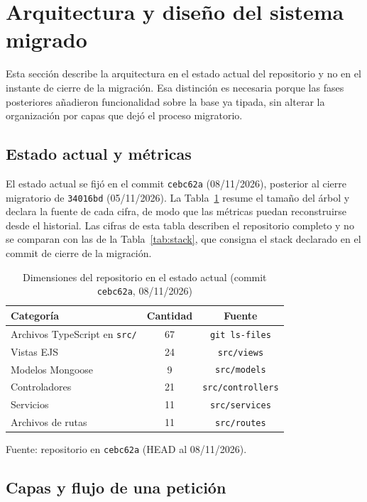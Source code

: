 \documentclass[conference]{IEEEtran}
\begin{document}
\section{Arquitectura y diseño del sistema migrado}

Esta sección describe la arquitectura en el estado actual del repositorio y no
en el instante de cierre de la migración. Esa distinción es necesaria porque las
fases posteriores añadieron funcionalidad sobre la base ya tipada, sin alterar
la organización por capas que dejó el proceso migratorio.

\subsection{Estado actual y métricas}

El estado actual se fijó en el commit \texttt{cebc62a} (08/11/2026), posterior
al cierre migratorio de \texttt{34016bd} (05/11/2026). La
Tabla~\ref{tab:actual} resume el tamaño del árbol y declara la fuente de cada
cifra, de modo que las métricas puedan reconstruirse desde el historial. Las
cifras de esta tabla describen el repositorio completo y no se comparan con las
de la Tabla~\ref{tab:stack}, que consigna el stack declarado en el commit de
cierre de la migración.

\begin{table}[!t]
\caption{Dimensiones del repositorio en el estado actual (commit \texttt{cebc62a}, 08/11/2026)}
\label{tab:actual}
\centering
\small
\begin{tabular}{@{}lcc@{}}
\toprule
Categoría & Cantidad & Fuente \\
\midrule
Archivos TypeScript en \texttt{src/} & 67 & \texttt{git ls-files} \\
Vistas EJS & 24 & \texttt{src/views} \\
Modelos Mongoose & 9 & \texttt{src/models} \\
Controladores & 21 & \texttt{src/controllers} \\
Servicios & 11 & \texttt{src/services} \\
Archivos de rutas & 11 & \texttt{src/routes} \\
\bottomrule
\end{tabular}

\vspace{2pt}
{\footnotesize Fuente: repositorio en \texttt{cebc62a} (HEAD al 08/11/2026).}
\end{table}

\subsection{Capas y flujo de una petición}
\end{document}
